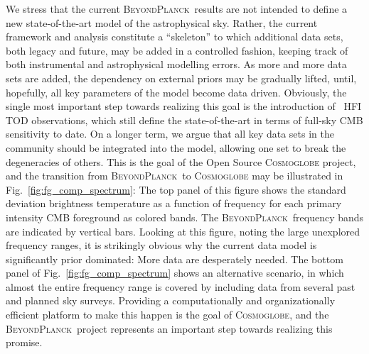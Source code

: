 \documentclass[twocolumn]{aa}
\newcommand{\BP}{\textsc{BeyondPlanck}}
\begin{document}
We stress that the current \BP\ results are not intended to define a
new state-of-the-art model of the astrophysical sky. Rather, the
current framework and analysis constitute a ``skeleton'' to which
additional data sets, both legacy and future, may be added in a
controlled fashion, keeping track of both instrumental and
astrophysical modelling errors. As more and more data sets are added,
the dependency on external priors may be gradually lifted, until,
hopefully, all key parameters of the model become data
driven. Obviously, the single most important step towards realizing
this goal is the introduction of \Planck\ HFI TOD observations, which
still define the state-of-the-art in terms of full-sky CMB sensitivity
to date. On a longer term, we argue that all key data sets in the
community should be integrated into the model, allowing one set to
break the degeneracies of others. This is the goal of the Open Source
\textsc{Cosmoglobe} project, and the transition from \BP\ to
\textsc{Cosmoglobe} may be illustrated in
Fig.~\ref{fig:fg_comp_spectrum}: The top panel of this figure shows
the standard deviation brightness temperature as a function of
frequency for each primary intensity CMB foreground as colored
bands. The \BP\ frequency bands are indicated by vertical
bars. Looking at this figure, noting the large unexplored frequency
ranges, it is strikingly obvious why the current data model is
significantly prior dominated: More data are desperately needed. The
bottom panel of Fig.~\ref{fig:fg_comp_spectrum} shows an alternative
scenario, in which almost the entire frequency range is
covered by including data from several past and planned sky surveys.
Providing a computationally and organizationally efficient
platform to make this happen is the goal of \textsc{Cosmoglobe}, and
the \BP\ project represents an important step towards realizing this
promise. 






\end{document}
